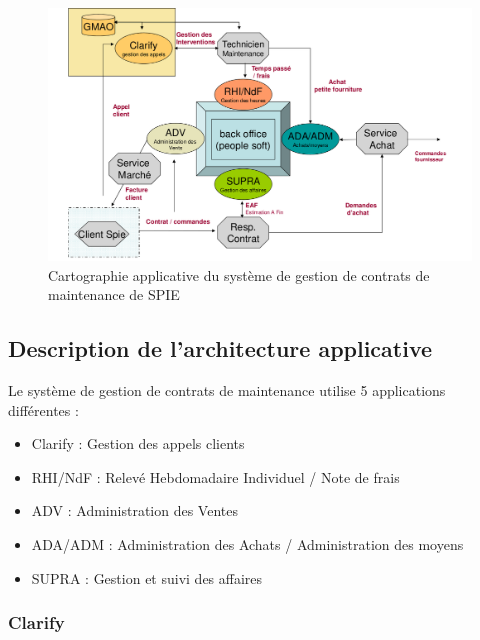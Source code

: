 \begin{figure}[h!]
    \centering
    \includegraphics[width=140mm]{./images/cartographie_applicative.png}
    \caption{Cartographie applicative du système de gestion de contrats de maintenance de SPIE}
    \label{fig:carto_app}
\end{figure}

\subsection{Description de l'architecture applicative}

Le système de gestion de contrats de maintenance utilise 5 applications différentes :


\begin{itemize}
\item Clarify : Gestion des appels clients
\item RHI/NdF : Relevé Hebdomadaire Individuel / Note de frais
\item ADV : Administration des Ventes
\item ADA/ADM : Administration des Achats / Administration des moyens
\item SUPRA : Gestion et suivi des affaires
\end{itemize}


\subsubsection{Clarify}

